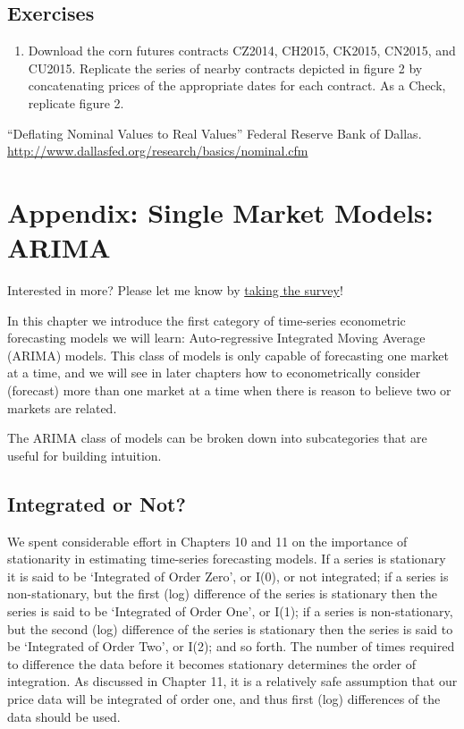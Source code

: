 \documentclass[
  letterpaper,
  DIV=11,
  numbers=noendperiod]{scrreprt}
\providecommand{\tightlist}{%
  \setlength{\itemsep}{0pt}\setlength{\parskip}{0pt}}\usepackage{longtable,booktabs,array}
\begin{document}
\hypertarget{exercises-10}{%
\section{Exercises}\label{exercises-10}}

\begin{enumerate}
\def\labelenumi{\arabic{enumi}.}
\tightlist
\item
  Download the corn futures contracts CZ2014, CH2015, CK2015, CN2015,
  and CU2015. Replicate the series of nearby contracts depicted in
  figure 2 by concatenating prices of the appropriate dates for each
  contract. As a Check, replicate figure 2.
\end{enumerate}

``Deflating Nominal Values to Real Values'' Federal Reserve Bank of
Dallas. \url{http://www.dallasfed.org/research/basics/nominal.cfm}


\hypertarget{appendix-single-market-models-arima}{%
\chapter{Appendix: Single Market Models:
ARIMA}\label{appendix-single-market-models-arima}}

{Interested in more? Please let me know by}
\href{https://forms.gle/Q3VByCQZHjfQSy9D7}{taking the survey}!

In this chapter we introduce the first category of time-series
econometric forecasting models we will learn: Auto-regressive Integrated
Moving Average (ARIMA) models. This class of models is only capable of
forecasting one market at a time, and we will see in later chapters how
to econometrically consider (forecast) more than one market at a time
when there is reason to believe two or markets are related.

The ARIMA class of models can be broken down into subcategories that are
useful for building intuition.

\hypertarget{integrated-or-not}{%
\section{Integrated or Not?}\label{integrated-or-not}}

We spent considerable effort in Chapters 10 and 11 on the importance of
stationarity in estimating time-series forecasting models. If a series
is stationary it is said to be `Integrated of Order Zero', or I(0), or
not integrated; if a series is non-stationary, but the first (log)
difference of the series is stationary then the series is said to be
`Integrated of Order One', or I(1); if a series is non-stationary, but
the second (log) difference of the series is stationary then the series
is said to be `Integrated of Order Two', or I(2); and so forth. The
number of times required to difference the data before it becomes
stationary determines the order of integration. As discussed in Chapter
11, it is a relatively safe assumption that our price data will be
integrated of order one, and thus first (log) differences of the data
should be used.
\end{document}

